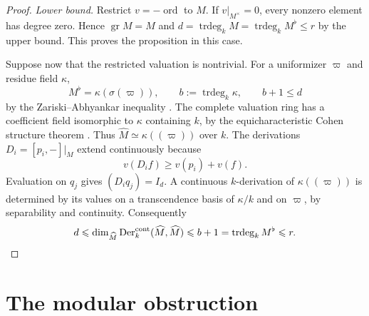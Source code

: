 \documentclass[11pt,a4paper]{article}
\renewcommand{\le}{\leqslant}\renewcommand{\ge}{\geqslant}
\newcommand{\trdeg}{\operatorname{trdeg}}
\newcommand{\gr}{\operatorname{gr}}
\theoremstyle{definition}
\begin{document}
\begin{proof}
\emph{Lower bound.} Restrict \(v=-\operatorname{ord}\) to \(M\). If \(v|_{M^\times}=0\), every nonzero element has degree zero. Hence \(\gr M=M\) and \(d=\trdeg_k M=\trdeg_k M^\flat\le r\) by the upper bound. This proves the proposition in this case.

Suppose now that the restricted valuation is nontrivial. For a uniformizer \(\varpi\) and residue field \(\kappa\),
\[
 M^\flat=\kappa(\sigma(\varpi)),\qquad b:=\trdeg_k\kappa,\qquad
 b+1\le d
\]
by the Zariski--Abhyankar inequality \cite[Thm.~2.1]{ELS}. The complete valuation ring has a coefficient field isomorphic to \(\kappa\) containing \(k\), by the equicharacteristic Cohen structure theorem \cite[Thm.~7.8]{Eisenbud}. Thus \(\widehat M\simeq\kappa((\varpi))\) over \(k\). The derivations \(D_i=[p_i,-]|_M\) extend continuously because
\[
 v(D_i f)\ge v(p_i)+v(f).
\]
Evaluation on \(q_j\) gives \((D_iq_j)=I_d\). A continuous \(k\)-derivation of \(\kappa((\varpi))\) is determined by its values on a transcendence basis of \(\kappa/k\) and on \(\varpi\), by separability and continuity. Consequently
\[
 d\le\dim_{\widehat M}\operatorname{Der}^{\rm cont}_k(\widehat M,\widehat M)
 \le b+1=\trdeg_k M^\flat\le r.\qedhere
\]
\end{proof}

\section{The modular obstruction}\label{sec:flow}
\end{document}

